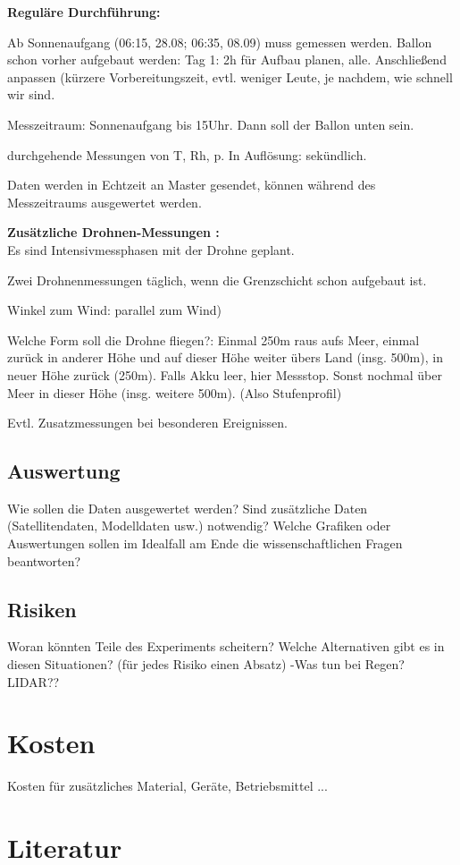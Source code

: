 \documentclass[a4paper,11pt,DIV=calc,tablecaptionabove,headinclude,twoside]{article}
\begin{document}
\textbf{Reguläre Durchführung:}\\
\item Ab Sonnenaufgang (06:15, 28.08; 06:35, 08.09) muss gemessen werden. Ballon schon vorher aufgebaut werden: Tag 1: 2h für Aufbau planen, alle. Anschließend anpassen (kürzere Vorbereitungszeit, evtl. weniger Leute, je nachdem, wie schnell wir sind.
\item Messzeitraum: Sonnenaufgang bis 15Uhr. Dann soll der Ballon unten sein.
\item durchgehende Messungen von T, Rh, p. In Auflösung: sekündlich.
\item Daten werden in Echtzeit an Master gesendet, können während des Messzeitraums ausgewertet werden.

\textbf{Zusätzliche Drohnen-Messungen :}\\
Es sind Intensivmessphasen mit der Drohne geplant.
\item Zwei Drohnenmessungen täglich, wenn die Grenzschicht schon aufgebaut ist.
\item Winkel zum Wind: parallel zum Wind)
\item Welche Form soll die Drohne fliegen?: Einmal 250m raus aufs Meer, einmal zurück in anderer Höhe und auf dieser Höhe weiter übers Land (insg. 500m), in neuer Höhe zurück (250m). Falls Akku leer, hier Messstop. Sonst nochmal über Meer in dieser Höhe (insg. weitere 500m). (Also Stufenprofil)
\item Evtl. Zusatzmessungen bei besonderen Ereignissen.
\subsection{Auswertung}
Wie sollen die Daten ausgewertet werden? Sind zusätzliche Daten (Satellitendaten, Modelldaten usw.) notwendig? Welche Grafiken oder Auswertungen sollen im Idealfall am Ende die wissenschaftlichen Fragen beantworten?

\subsection{Risiken}
Woran könnten Teile des Experiments scheitern? Welche Alternativen gibt es in diesen Situationen? (für jedes Risiko einen Absatz)
-Was tun bei Regen? LIDAR??
\section{Kosten}
Kosten für zusätzliches Material, Geräte, Betriebsmittel ...

\section*{Literatur}
\end{document}
